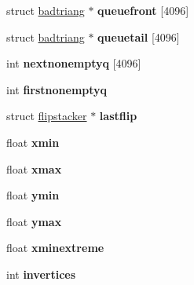 \begin{DoxyCompactItemize}
\item 
\hypertarget{structmesh_a9fb6633c391887f9ece4f47c6251d806}{struct \hyperlink{structbadtriang}{badtriang} $\ast$ {\bfseries queuefront} \mbox{[}4096\mbox{]}}\label{structmesh_a9fb6633c391887f9ece4f47c6251d806}

\item 
\hypertarget{structmesh_a194e9c6cc034fe96c3eb3d6660e0d5d7}{struct \hyperlink{structbadtriang}{badtriang} $\ast$ {\bfseries queuetail} \mbox{[}4096\mbox{]}}\label{structmesh_a194e9c6cc034fe96c3eb3d6660e0d5d7}

\item 
\hypertarget{structmesh_a67dae9c18940347bff87ac492258acb5}{int {\bfseries nextnonemptyq} \mbox{[}4096\mbox{]}}\label{structmesh_a67dae9c18940347bff87ac492258acb5}

\item 
\hypertarget{structmesh_a420eac8320d421bf6ba4d68daef14107}{int {\bfseries firstnonemptyq}}\label{structmesh_a420eac8320d421bf6ba4d68daef14107}

\item 
\hypertarget{structmesh_a8a82d7821fd526fb8f406be1ece5b591}{struct \hyperlink{structflipstacker}{flipstacker} $\ast$ {\bfseries lastflip}}\label{structmesh_a8a82d7821fd526fb8f406be1ece5b591}

\item 
\hypertarget{structmesh_a012492da56eb51620445a9dcd5ea8e86}{float {\bfseries xmin}}\label{structmesh_a012492da56eb51620445a9dcd5ea8e86}

\item 
\hypertarget{structmesh_afaf91f190df7ef74e366e37b595fa5d7}{float {\bfseries xmax}}\label{structmesh_afaf91f190df7ef74e366e37b595fa5d7}

\item 
\hypertarget{structmesh_a2e59b1b1ffc697a6fb0c083aa2cc529b}{float {\bfseries ymin}}\label{structmesh_a2e59b1b1ffc697a6fb0c083aa2cc529b}

\item 
\hypertarget{structmesh_a9342de12099a3af37055e37195e079f0}{float {\bfseries ymax}}\label{structmesh_a9342de12099a3af37055e37195e079f0}

\item 
\hypertarget{structmesh_a89d181fb1bbc286667fa2c767f0a72c3}{float {\bfseries xminextreme}}\label{structmesh_a89d181fb1bbc286667fa2c767f0a72c3}

\item 
\hypertarget{structmesh_a35525eea6ffd1d5614056308a7530666}{int {\bfseries invertices}}\label{structmesh_a35525eea6ffd1d5614056308a7530666}


\end{DoxyCompactItemize}
